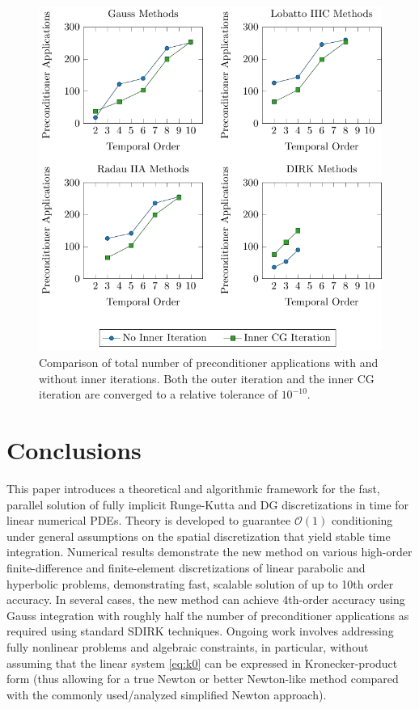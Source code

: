 \documentclass[a4paper,10pt]{article}
\begin{document}
\begin{figure}[!ht]
	\centering
	\includegraphics{figures/high_order_diff_iters/high_order_diff_iters}
	\caption{
		Comparison of total number of preconditioner applications with and without
		inner iterations.
		Both the outer iteration and the inner CG iteration are converged to a
		relative tolerance of $10^{-10}$.
	}
	\label{fig:high-order-diff-iters}
\end{figure}

\section{Conclusions}\label{sec:conc}

This paper introduces a theoretical and algorithmic framework for the fast, parallel
solution of fully implicit Runge-Kutta and DG discretizations in time for linear
numerical PDEs. Theory is developed to guarantee $\mathcal{O}(1)$ conditioning under
general assumptions on the spatial discretization that yield stable time integration.
Numerical results demonstrate the new method on various high-order finite-difference
and finite-element discretizations of linear parabolic and hyperbolic problems,
demonstrating fast, scalable solution of up to 10th order accuracy. In several
cases, the new method can achieve 4th-order accuracy using Gauss integration
with roughly half the number of preconditioner applications as required using
standard SDIRK techniques. Ongoing work involves addressing fully nonlinear
problems and algebraic constraints, in particular, without assuming that the
linear system \eqref{eq:k0} can be expressed in Kronecker-product form (thus
allowing for a true Newton or better Newton-like method compared with the
commonly used/analyzed simplified Newton approach).
\end{document}
